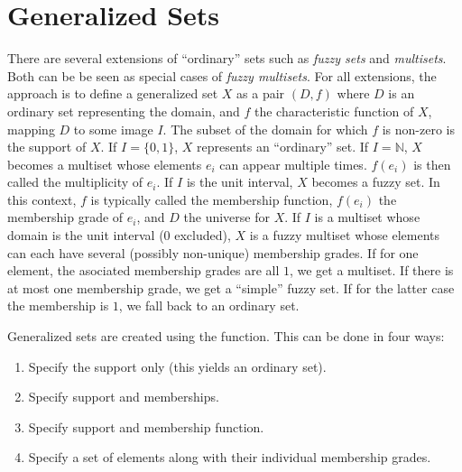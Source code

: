 \documentclass[fleqn]{article}
\newcommand{\dQuote}[1]{``{#1}''}
\newcommand{\codefun}[1]{\code{#1()}}
\begin{document}
\section{Generalized Sets}
\label{sec:gsets}

There are several extensions of \dQuote{ordinary} sets such as \emph{fuzzy sets}
and \emph{multisets}. Both can be be seen as special cases of
\emph{fuzzy multisets}. For all extensions, the approach is to define
a generalized set $X$ as a pair $(D, f)$ where $D$ is an ordinary set
representing the domain,
and $f$ the characteristic function of $X$, mapping
$D$ to some image $I$.  The subset of the domain for which $f$ is
non-zero is the support of $X$.
If $I=\{0, 1\}$, $X$
represents an \dQuote{ordinary} set. If $I=\mathbb{N}$, $X$ becomes
a multiset whose elements $e_i$ can appear multiple times. $f(e_i)$ is
then called the multiplicity of $e_i$. If $I$ is the unit interval,
$X$ becomes a fuzzy set. In this context, $f$ is typically called the membership
function, $f(e_i)$ the membership grade of $e_i$, and $D$ the universe
for $X$. If $I$ is a multiset whose domain is the unit interval (0 excluded),
$X$ is a fuzzy multiset whose elements can each have several
(possibly non-unique) membership grades. If for one element, the
asociated membership grades are all $1$, we get a multiset. If there
is at most one membership grade, we get a \dQuote{simple} fuzzy set. If for
the latter case the membership is $1$, we fall back to an ordinary set.

Generalized sets are created using the \codefun{gset} function. This
can be done in four ways:

\begin{enumerate}
\item Specify the support only (this yields an ordinary set).
\item Specify support and memberships.
\item Specify support and membership function.
\item Specify a set of elements along with their individual membership grades.
\end{enumerate}
\end{document}
